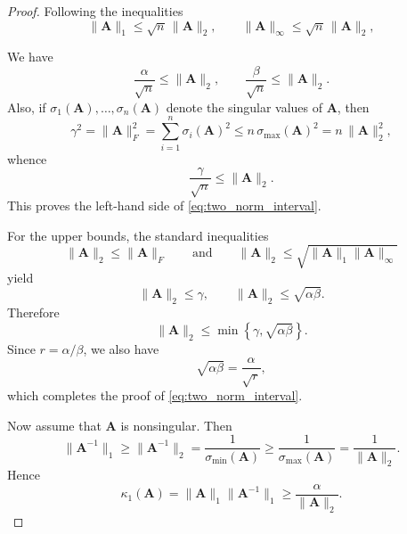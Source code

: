 \documentclass[10pt,a4paper]{amsart}
\begin{document}
\begin{proof}
Following the inequalities
\begin{equation*}
\|\mathbf{A}\|_1\le \sqrt{n}\,\|\mathbf{A}\|_2,
\qquad
\|\mathbf{A}\|_\infty\le \sqrt{n}\,\|\mathbf{A}\|_2,
\end{equation*}

We have
\begin{equation*}
\frac{\alpha}{\sqrt{n}}\le \|\mathbf{A}\|_2,
\qquad
\frac{\beta}{\sqrt{n}}\le \|\mathbf{A}\|_2.
\end{equation*}
Also, if $\sigma_1(\mathbf{A}),\dots,\sigma_n(\mathbf{A})$ denote the singular values of $\mathbf{A}$, then
\begin{equation*}
\gamma^2
=
\|\mathbf{A}\|_F^2
=
\sum_{i=1}^n \sigma_i(\mathbf{A})^2
\le
n\,\sigma_{\max}(\mathbf{A})^2
=
n\,\|\mathbf{A}\|_2^2,
\end{equation*}
whence
\begin{equation*}
\frac{\gamma}{\sqrt{n}}\le \|\mathbf{A}\|_2.
\end{equation*}
This proves the left-hand side of \eqref{eq:two_norm_interval}.

For the upper bounds, the standard inequalities
\begin{equation*}
\|\mathbf{A}\|_2\le \|\mathbf{A}\|_F
\qquad\text{and}\qquad
\|\mathbf{A}\|_2\le \sqrt{\|\mathbf{A}\|_1\|\mathbf{A}\|_\infty}
\end{equation*}
yield
\begin{equation*}
\|\mathbf{A}\|_2\le \gamma,
\qquad
\|\mathbf{A}\|_2\le \sqrt{\alpha\beta}.
\end{equation*}
Therefore
\begin{equation*}
\|\mathbf{A}\|_2\le \min\!\left\{\gamma,\sqrt{\alpha\beta}\right\}.
\end{equation*}
Since $r=\alpha/\beta$, we also have
\begin{equation*}
\sqrt{\alpha\beta}=\frac{\alpha}{\sqrt{r}},
\end{equation*}
which completes the proof of \eqref{eq:two_norm_interval}.

Now assume that $\mathbf{A}$ is nonsingular. Then
\begin{equation*}
\|\mathbf{A}^{-1}\|_1\ge \|\mathbf{A}^{-1}\|_2
=
\frac{1}{\sigma_{\min}(\mathbf{A})}
\ge
\frac{1}{\sigma_{\max}(\mathbf{A})}
=
\frac{1}{\|\mathbf{A}\|_2}.
\end{equation*}
Hence
\begin{equation*}
\kappa_1(\mathbf{A})
=
\|\mathbf{A}\|_1\|\mathbf{A}^{-1}\|_1
\ge
\frac{\alpha}{\|\mathbf{A}\|_2}.
\end{equation*}


\end{proof}
\end{document}
